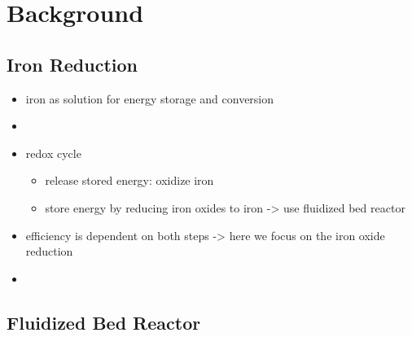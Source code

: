 \newpage
\chapter{Background}
\section{Iron Reduction}
\begin{itemize}
    \item iron as solution for energy storage and conversion
    \item 
    \item redox cycle
    \begin{itemize}
        \item release stored energy: oxidize iron
        \item store energy by reducing iron oxides to iron -> use fluidized bed reactor
    \end{itemize}
    \item efficiency is dependent on both steps -> here we focus on the iron oxide reduction
    \item 
\end{itemize}
\section{Fluidized Bed Reactor}